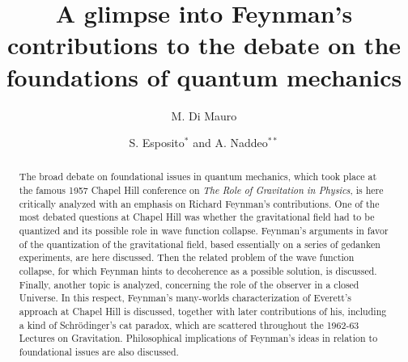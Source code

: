 \documentclass{ws-procs961x669}            %
\begin{document}
\title{A glimpse into Feynman's contributions to the debate on the foundations of quantum mechanics}

\author{M. Di Mauro}

\address{Dipartimento di Matematica, Universit\`a di Salerno,
Via Giovanni Paolo II,\\
Fisciano (SA), 84084, Italy\\
E-mail: madimauro@unisa.it}


\author{S. Esposito$^*$ and A. Naddeo$^{**}$}

\address{INFN, Sezione di Napoli, C. U. Monte S. Angelo, Via Cinthia,\\
Napoli, 80125, Italy\\
$^*$E-mail: sesposit@na.infn.it\\
$^{**}$E-mail: anaddeo@na.infn.it}



\begin{abstract}
The broad debate on foundational issues in quantum mechanics,
which took place at the famous 1957 Chapel Hill conference on
\textit{The Role of Gravitation in Physics}, is here critically
analyzed with an emphasis on Richard Feynman's contributions. One
of the most debated questions at Chapel Hill was whether the
gravitational field had to be quantized and its possible role in
wave function collapse. Feynman's arguments in favor of the
quantization of the gravitational field, based essentially on a
series of gedanken experiments, are here discussed. Then the
related problem of the wave function collapse, for which Feynman
hints to decoherence as a possible solution, is discussed.
Finally, another topic is analyzed, concerning the role of the
observer in a closed Universe. In this respect, Feynman's
many-worlds characterization of Everett's approach at Chapel Hill
is discussed, together with later contributions of his, including
a kind of Schr\"{o}dinger's cat paradox, which are scattered
throughout the 1962-63 Lectures on Gravitation. Philosophical
implications of Feynman's ideas in relation to foundational issues
are also discussed.
\end{abstract}


\bodymatter
\end{document}
